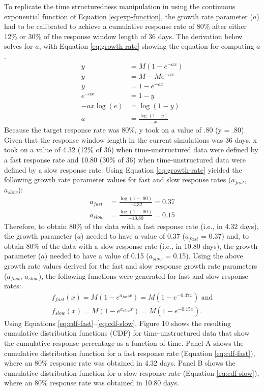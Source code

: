 \documentclass[
12pt, %
twoside,
english]{guelphthesis}
\begin{document}
To replicate the time structuredness manipulation in \textcite{coulombe2016} using the continuous exponential function of Equation \ref{eq:exp-function}, the growth rate parameter (\(a\)) had to be calibrated to achieve a cumulative response rate of 80\% after either 12\% or 30\% of the response window length of 36 days. The derivation below solves for \(a\), with Equation \ref{eq:growth-rate} showing the equation for computing \(a\).
\begin{align}
y  &= M(1 - e^{-ax}) \nonumber \\
y &= M - Me^{-ax} \nonumber \\
y &= 1 -e^{-ax} \nonumber \\
e^{-ax} &= 1-y \nonumber \\
-ax\log(e) &= \log(1 - y) \nonumber \\
a &= \frac{\log(1 - y)}{-x}
\label{eq:growth-rate}
\end{align}
\noindent Because the target response rate was 80\%, y took on a value of .80 (y = .80). Given that the response window length in the current simulations was 36 days, x took on a value of 4.32 (12\% of 36) when time-unstructured data were defined by a fast response rate and 10.80 (30\% of 36) when time-unstructured data were defined by a slow response rate. Using Equation \ref{eq:growth-rate} yielded the following growth rate parameter values for fast and slow response rates (\(a_{fast}\), \(a_{slow}\)):
\begin{align}
a_{fast} &= \frac{\log(1 - .80)}{-4.32} = 0.37 \nonumber \\
a_{slow} &= \frac{\log(1 - .80)}{-10.80} = 0.15 \nonumber
\end{align}
\noindent Therefore, to obtain 80\% of the data with a fast response rate (i.e., in 4.32 days), the growth parameter (\(a\)) needed to have a value of 0.37 (\(a_{fast}\) = 0.37) and, to obtain 80\% of the data with a slow response rate (i.e., in 10.80 days), the growth parameter (\(a\)) needed to have a value of 0.15 (\(a_{slow}\) = 0.15). Using the above growth rate values derived for the fast and slow response growth rate parameters (\(a_{fast}\), \(a_{slow}\)), the following functions were generated for fast and slow response rates:
\begin{align}
f_{fast}(x) = M(1 - e^{a_{fast}x}) = M(1 - e^{-0.37x}) \text{ and} \label{eq:cdf-fast}\\
f_{slow}(x) = M(1 - e^{a_{slow}x}) = M(1 - e^{-0.15x}).\label{eq:cdf-slow}
\end{align}
\noindent Using Equations \ref{eq:cdf-fast}--\ref{eq:cdf-slow}, Figure 10 shows the resulting cumulative distribution functions (CDF) for time-unstructured data that show the cumulative response percentage as a function of time. Panel A shows the cumulative distribution function for a fast response rate (Equation \ref{eq:cdf-fast}), where an 80\% response rate was obtained in 4.32 days. Panel B shows the cumulative distribution function for a slow response rate (Equation \ref{eq:cdf-slow}), where an 80\% response rate was obtained in 10.80 days.
\end{document}

